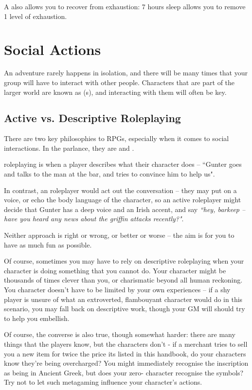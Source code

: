 A  also allows you to recover from exhaustion: 7 hours sleep allows you to remove 1 level of exhaustion. 


\section{Social Actions}

An adventure rarely happens in isolation, and there will be many times that your group will have to interact with other people. Characters that are part of the larger world are known as  (s), and interacting with them will often be key. 

\subsection{Active vs. Descriptive Roleplaying}

There are two key philosophies to RPGs, especially when it comes to social interactions. In the  parlance, they are  and . 

 roleplaying is when a player describes what their character does -- ``Gunter goes and talks to the man at the bar, and tries to convince him to help us". 

In contrast, an  roleplayer would act out the conversation -- they may put on a voice, or echo the body language of the character, so an active roleplayer might decide that Gunter has a deep voice and an Irish accent, and say {\it ``hey, barkeep -- have you heard any news about the griffin attacks recently?"}. 

Neither approach is right or wrong, or better or worse -- the aim is for you to have as much fun as possible. 

Of course, sometimes you may have to rely on descriptive roleplaying when your character is doing something that you cannot do. Your character might be thousands of times clever than you, or charismatic beyond all human reckoning. You character doesn't have to be limited by your own experiences -- if a shy player is unsure of what an extroverted, flambouyant character would do in this scenario, you may fall back on descriptive work, though your GM will should try to help you embellish.

Of course, the converse is also true, though somewhat harder: there are many things that the players know, but the characters don't - if a merchant tries to sell you a new item for twice the price its listed in this handbook, do your characters know they're being overcharged? You might immediately recognise the inscription as being in Ancient Greek, but does your zero- character recognise the symbols? Try not to let such metagaming influence your character's actions. 

